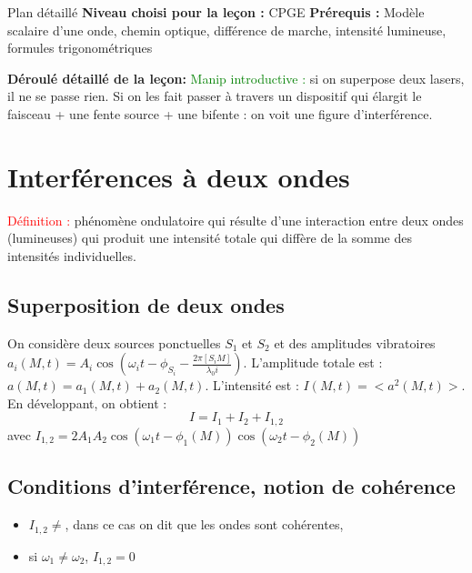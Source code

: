 \begin{reportBlock}{Plan détaillé}
  \textbf{Niveau choisi pour la leçon :} CPGE
  \newline
  \textbf{Prérequis : }Modèle scalaire d'une onde, chemin optique, différence de marche, intensité lumineuse, formules trigonométriques
  \newline
  
  \textbf{Déroulé détaillé de la leçon: } \newline
\textcolor{green}{Manip introductive :} si on superpose deux lasers, il ne se passe rien. Si on les fait passer à travers un dispositif qui élargit le faisceau + une fente source + une bifente : on voit une figure d'interférence.
  \section{Interférences à deux ondes}
  \textcolor{red}{Définition :} phénomène ondulatoire qui résulte d'une interaction entre deux ondes (lumineuses) qui produit une intensité totale qui diffère de la somme des intensités individuelles.
  \subsection{Superposition de deux ondes}
  On considère deux sources ponctuelles $S_1$ et $S_2$ et des amplitudes vibratoires $a_i(M,t)=A_i\cos\left(\omega_it-\phi_{S_i} - \frac{2\pi[S_iM]}{\lambda_0i}\right)$. L'amplitude totale est : $a(M,t)=a_1(M,t)+a_2(M,t)$. L'intensité est : $I(M,t) = <a^2(M,t)>$.\\

  En développant, on obtient :
  \begin{equation}
      I = I_1 + I_2 + I_{1,2}
  \end{equation}
  avec $I_{1,2} = 2A_1A_2\cos\left(\omega_1t-\phi_1(M)\right)\cos\left(\omega_2t-\phi_2(M)\right)$

  \subsection{Conditions d'interférence, notion de cohérence}
  \begin{itemize}
      \item $I_{1,2}\neq$, dans ce cas on dit que les ondes sont cohérentes,
      \item si $\omega_1\neq\omega_2$, $I_{1,2}=0$
  \end{itemize}


\end{reportBlock}
